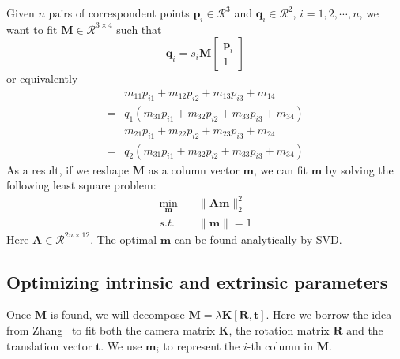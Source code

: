 \documentclass[10pt,twocolumn,letterpaper]{article}
\begin{document}
\noindent
Given $n$ pairs of correspondent points $\mathbf{p}_i\in\mathcal{R}^3$ and $\mathbf{q}_i\in\mathcal{R}^2$, $i=1,2,\cdots, n$, we want to fit $\mathbf{M}\in\mathcal{R}^{3\times 4}$ such that
\begin{equation}
\mathbf{q}_i=s_i\mathbf{M}\left[
\begin{array}{c}
\mathbf{p}_i\\
1
\end{array}
\right ]
\end{equation}
or equivalently
\begin{equation}
\begin{split}
&m_{11}p_{i1}+m_{12}p_{i2}+m_{13}p_{i3}+m_{14}\\
=&q_1(m_{31}p_{i1}+m_{32}p_{i2}+m_{33}p_{i3}+m_{34})\\
&m_{21}p_{i1}+m_{22}p_{i2}+m_{23}p_{i3}+m_{24}\\
=&q_2(m_{31}p_{i1}+m_{32}p_{i2}+m_{33}p_{i3}+m_{34})
\end{split}
\end{equation}
As a result, if we reshape $\mathbf{M}$ as a column vector $\mathbf{m}$, we can fit $\mathbf{m}$ by solving the following least square problem:
\begin{equation}
\begin{split}
\min_{\mathbf{m}}&\quad \|\mathbf{Am}\|_2^2\\
s.t.&\quad \|\mathbf{m}\|=1
\end{split}
\end{equation}
Here $\mathbf{A}\in\mathcal{R}^{2n\times 12}$. The optimal $\mathbf{m}$ can be found analytically by SVD.

\subsection{Optimizing intrinsic and extrinsic parameters}

\noindent
Once $\mathbf{M}$ is found, we will decompose $\mathbf{M}=\lambda\mathbf{K[R,t]}$. Here we borrow the idea from Zhang~\cite{zhang2000flexible} to fit both the camera matrix $\mathbf{K}$, the rotation matrix $\mathbf{R}$ and the translation vector $\mathbf{t}$. We use $\mathbf{m}_i$ to represent the $i$-th column in $\mathbf{M}$.
\end{document}
